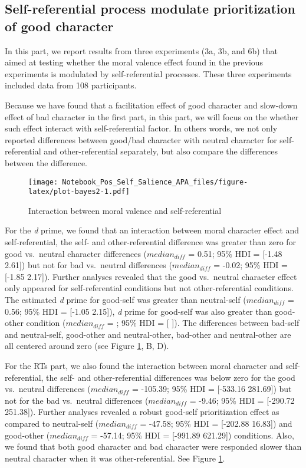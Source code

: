 \documentclass[
  man]{apa6}
\begin{document}
\hypertarget{self-referential-process-modulate-prioritization-of-good-character}{%
\subsection{Self-referential process modulate prioritization of good character}\label{self-referential-process-modulate-prioritization-of-good-character}}

In this part, we report results from three experiments (3a, 3b, and 6b) that aimed at testing whether the moral valence effect found in the previous experiments is modulated by self-referential processes. These three experiments included data from 108 participants.

Because we have found that a facilitation effect of good character and slow-down effect of bad character in the first part, in this part, we will focus on the whether such effect interact with self-referential factor. In others words, we not only reported differences between good/bad character with neutral character for self-referential and other-referential separately, but also compare the differences between the difference.

\begin{figure}
\centering
\texttt{[image: Notebook\_Pos\_Self\_Salience\_APA\_files/figure-latex/plot-bayes2-1.pdf]}
\caption{\label{fig:plot-bayes2}Interaction between moral valence and self-referential}
\end{figure}

For the \emph{d} prime, we found that an interaction between moral character effect and self-referential, the self- and other-referential difference was greater than zero for good vs.~neutral character differences (\(median_{diff}\) = 0.51; 95\% HDI = {[}-1.48 2.61{]}) but not for bad vs.~neutral differences (\(median_{diff}\) = -0.02; 95\% HDI = {[}-1.85 2.17{]}). Further analyses revealed that the good vs.~neutral character effect only appeared for self-referential conditions but not other-referential conditions. The estimated \emph{d} prime for good-self was greater than neutral-self (\(median_{diff}\) = 0.56; 95\% HDI = {[}-1.05 2.15{]}), \emph{d} prime for good-self was also greater than good-other condition (\(median_{diff}\) = ; 95\% HDI = {[} {]}). The differences between bad-self and neutral-self, good-other and neutral-other, bad-other and neutral-other are all centered around zero (see Figure \ref{fig:plot-bayes2}, B, D).

For the RTs part, we also found the interaction between moral character and self-referential, the self- and other-referential differences was below zero for the good vs.~neutral differences (\(median_{diff}\) = -105.39; 95\% HDI = {[}-533.16 281.69{]}) but not for the bad vs.~neutral differences (\(median_{diff}\) = -9.46; 95\% HDI = {[}-290.72 251.38{]}). Further analyses revealed a robust good-self prioritization effect as compared to neutral-self (\(median_{diff}\) = -47.58; 95\% HDI = {[}-202.88 16.83{]}) and good-other (\(median_{diff}\) = -57.14; 95\% HDI = {[}-991.89 621.29{]}) conditions. Also, we found that both good character and bad character were responded slower than neutral character when it was other-referential. See Figure \ref{fig:plot-bayes2}.
\end{document}
